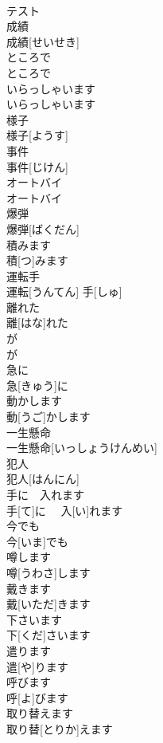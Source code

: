 \documentclass[8pt]{extreport}
\begin{document}
\begin{CJK}{UTF8}{min}
\\	テスト	
\\	成績	
\\	成績[せいせき]	
\\	ところで	
\\	ところで	
\\	いらっしゃいます
\\	いらっしゃいます
\\	様子	
\\	様子[ようす]	
\\	事件	
\\	事件[じけん]	
\\	オートバイ	
\\	オートバイ	
\\	爆弾	
\\	爆弾[ばくだん]	
\\	積みます	
\\	積[つ]みます	
\\	運転手	
\\	運転[うんてん] 手[しゅ]	
\\	離れた	
\\	離[はな]れた	
\\	が	
\\	が	
\\	急に	
\\	急[きゅう]に	
\\	動かします	
\\	動[うご]かします	
\\	一生懸命	
\\	一生懸命[いっしょうけんめい]	
\\	犯人	
\\	犯人[はんにん]	
\\	手に　入れます	
\\	手[て]に　 入[い]れます	
\\	今でも	
\\	今[いま]でも	
\\	噂します	
\\	噂[うわさ]します	
\\	戴きます	
\\	戴[いただ]きます	
\\	下さいます	
\\	下[くだ]さいます	
\\	遣ります	
\\	遣[や]ります	
\\	呼びます	
\\	呼[よ]びます	
\\	取り替えます	
\\	取り替[とりか]えます	

\end{CJK}
\end{document}
